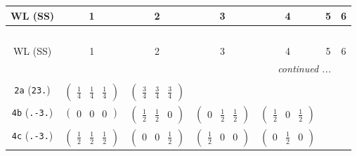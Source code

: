 \documentclass[fleqn,9pt,landscape]{jsarticle}
\begin{document}
\begin{center}
\renewcommand{\arraystretch}{1.2}
\begin{longtable}{ccccccc}
 \hline \hline
WL (SS) & 1 & 2 & 3 & 4 & 5 & 6 \\ \hline \endfirsthead

\multicolumn{6}{l}{\tablename\ \thetable{}} \\
 \hline \hline
WL (SS) & 1 & 2 & 3 & 4 & 5 & 6 \\ \hline \endhead

 \hline \hline
\multicolumn{6}{r}{\footnotesize\it continued ...} \\ \endfoot

 \hline \hline
\multicolumn{6}{r}{} \\ \endlastfoot

{\tt 2a} ({\tt 23.}) & $ \begin{pmatrix} \frac{1}{4} & \frac{1}{4} & \frac{1}{4} \end{pmatrix} $ & $ \begin{pmatrix} \frac{3}{4} & \frac{3}{4} & \frac{3}{4} \end{pmatrix} $ & $  $ & $  $ & $  $ & $  $ \\ \hline
{\tt 4b} ({\tt .-3.}) & $ \begin{pmatrix} 0 & 0 & 0 \end{pmatrix} $ & $ \begin{pmatrix} \frac{1}{2} & \frac{1}{2} & 0 \end{pmatrix} $ & $ \begin{pmatrix} 0 & \frac{1}{2} & \frac{1}{2} \end{pmatrix} $ & $ \begin{pmatrix} \frac{1}{2} & 0 & \frac{1}{2} \end{pmatrix} $ & $  $ & $  $ \\ \hline
{\tt 4c} ({\tt .-3.}) & $ \begin{pmatrix} \frac{1}{2} & \frac{1}{2} & \frac{1}{2} \end{pmatrix} $ & $ \begin{pmatrix} 0 & 0 & \frac{1}{2} \end{pmatrix} $ & $ \begin{pmatrix} \frac{1}{2} & 0 & 0 \end{pmatrix} $ & $ \begin{pmatrix} 0 & \frac{1}{2} & 0 \end{pmatrix} $ & $  $ & $  $ \\ \hline

\end{longtable}
\end{center}
\end{document}
